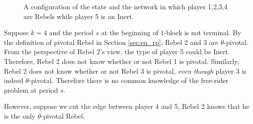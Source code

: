\documentclass[12pt,letter]{article}
\newtheorem{conjecture}{Conjecture}[section]
\theoremstyle{definition}
\theoremstyle{remark}
\theoremstyle{claim}
\begin{document}
\begin{figure}[!h]
\caption{A configuration of the state and the network in which player 1,2,3,4 are Rebels while player 5 is an Inert.}
\label{fig:cyclic_network}
\begin{center}
\end{center}
\end{figure}

Suppose $k=4$ and the period $s$ at the beginning of $1$-block is not terminal. By the definition of pivotal Rebel in Section \ref{sec:eq_rp}, Rebel 2 and 3 are $\theta$-pivotal. From the perspective of Rebel 2's view, the type of player 5 could be Inert. Therefore, Rebel 2 does not know whether or not Rebel 1 is pivotal. Similarly, Rebel 2 does not know whether or not Rebel 3 is pivotal, \textit{even though} player 3 is indeed $\theta$-pivotal. Therefore there is no common knowledge of the free-rider problem at period $s$.  

However, suppose we cut the edge between player 4 and 5, Rebel 2 knows that he is the only $\theta$-pivotal Rebel.


%
%
%
%
\end{document}
